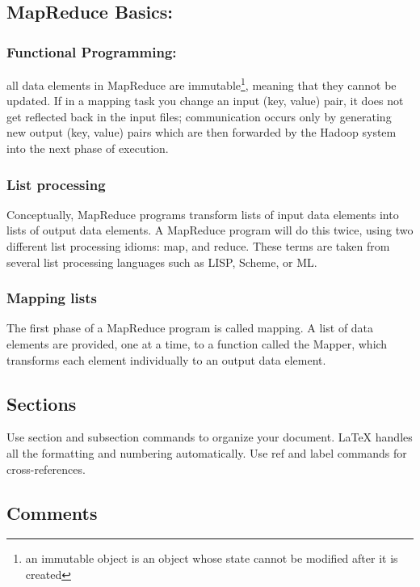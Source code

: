 \subsection{MapReduce Basics:}

\subsubsection{Functional Programming:}
all data elements in MapReduce are immutable\footnote{an immutable object is an object whose state cannot be modified after it is created}, meaning that they cannot be updated. If in a mapping task you change an input (key, value) pair, it does not get reflected back in the input files; communication occurs only by generating new output (key, value) pairs which are then forwarded by the Hadoop system into the next phase of execution.

\subsubsection{List processing}

Conceptually, MapReduce programs transform lists of input data elements into lists of output data elements. A MapReduce program will do this twice, using two different list processing idioms: map, and reduce. These terms are taken from several list processing languages such as LISP, Scheme, or ML.

\subsubsection{Mapping lists}

The first phase of a MapReduce program is called mapping. A list of data elements are provided, one at a time, to a function called the Mapper, which transforms each element individually to an output data element.


\subsection{Sections}

Use section and subsection commands to organize your document. \LaTeX{} handles all the formatting and numbering automatically. Use ref and label commands for cross-references.

\subsection{Comments}

